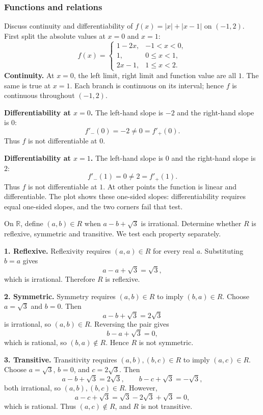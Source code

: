 \subsubsection{Functions and relations}
\begin{enumerate}[label={},leftmargin=0pt,itemsep=9pt]
 Discuss continuity and differentiability of $f(x)=|x|+|x-1|$ on $(-1,2)$.
\solution First split the absolute values at $x=0$ and $x=1$:
\[
f(x)=\begin{cases}
1-2x,&-1<x<0,\\
1,&0\le x<1,\\
2x-1,&1\le x<2.
\end{cases}
\]
\textbf{Continuity.} At $x=0$, the left limit, right limit and function value are all $1$. The same is true at $x=1$. Each branch is continuous on its interval; hence $f$ is continuous throughout $(-1,2)$.

\textbf{Differentiability at $x=0$.} The left-hand slope is $-2$ and the right-hand slope is $0$:
\[
f'_-(0)=-2\ne0=f'_+(0).
\]
Thus $f$ is not differentiable at $0$.

\textbf{Differentiability at $x=1$.} The left-hand slope is $0$ and the right-hand slope is $2$:
\[
f'_-(1)=0\ne2=f'_+(1).
\]
Thus $f$ is not differentiable at $1$. At other points the function is linear and differentiable. The plot shows these one-sided slopes: differentiability requires equal one-sided slopes, and the two corners fail that test.

 On $\mathbb R$, define $(a,b)\in R$ when $a-b+\sqrt3$ is irrational. Determine whether $R$ is reflexive, symmetric and transitive.
\solution We test each property separately.

\textbf{1. Reflexive.} Reflexivity requires $(a,a)\in R$ for every real $a$. Substituting $b=a$ gives
\[
a-a+\sqrt3=\sqrt3,
\]
which is irrational. Therefore $R$ is reflexive.

\textbf{2. Symmetric.} Symmetry requires $(a,b)\in R$ to imply $(b,a)\in R$. Choose $a=\sqrt3$ and $b=0$. Then
\[
a-b+\sqrt3=2\sqrt3
\]
is irrational, so $(a,b)\in R$. Reversing the pair gives
\[
b-a+\sqrt3=0,
\]
which is rational, so $(b,a)\notin R$. Hence $R$ is not symmetric.

\textbf{3. Transitive.} Transitivity requires $(a,b),(b,c)\in R$ to imply $(a,c)\in R$. Choose $a=\sqrt3$, $b=0$, and $c=2\sqrt3$. Then
\[
a-b+\sqrt3=2\sqrt3,\qquad b-c+\sqrt3=-\sqrt3,
\]
both irrational, so $(a,b),(b,c)\in R$. However,
\[
a-c+\sqrt3=\sqrt3-2\sqrt3+\sqrt3=0,
\]
which is rational. Thus $(a,c)\notin R$, and $R$ is not transitive.


\end{enumerate}
